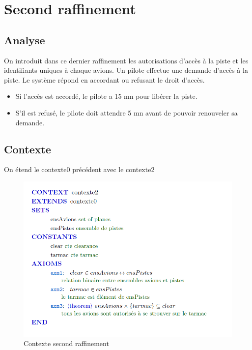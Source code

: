 
\section{Second raffinement}



\subsection{Analyse}
On introduit dans ce dernier raffinement les autorisations d'accès à la piste et les identifiants uniques à chaque avions. Un pilote effectue une demande d'accès
à la piste. Le système répond en accordant ou refusant le droit d'accès. 

\begin{itemize}
	\item Si l'accès est accordé, le pilote a 15 mn pour libérer la piste.
	\item S'il est refusé, le pilote doit attendre 5 mn avant de pouvoir renouveler sa demande.   
\end{itemize}  

\subsection{Contexte}
On étend le contexte0 précédent avec le contexte2

\begin{figure}[H]
	\begin{center}	
		\includegraphics[scale=0.7]{images/2/ctx2}
		\caption{Contexte second raffinement}
		\label{ctx2}
	\end{center}
\end{figure}

